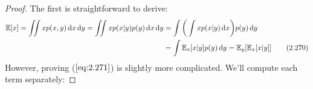 \vspace{1em}

\begin{proof}
    The first is straightforward to derive:
    \begin{align*}
        \mathbb{E}[x] 
        = \iint x p(x, y) \mathop{}\!\mathrm{d} x \mathop{}\!\mathrm{d} y
        = \iint x p(x | y) p(y) \mathop{}\!\mathrm{d} x \mathop{}\!\mathrm{d} y
        &= \int\bigg(\int x p(x | y) \mathop{}\!\mathrm{d} x\bigg) p(y) \mathop{}\!\mathrm{d} y \\
        &= \int \mathbb{E}_x[x | y] p(y) \mathop{}\!\mathrm{d} y 
        = \mathbb{E}_y[\mathbb{E}_x[x | y]]
        \tag{2.270}
    \end{align*}
    However, proving ($\ref{eq:2.271}$) is slightly more complicated.
    We'll compute each term separately:
    
\end{proof}
